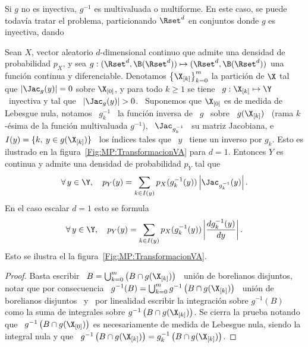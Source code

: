 Si $g$ no es inyectiva, $g^{-1}$  es multivaluada o multiforme. En este caso, se
puede todav\'ia  tratar el problema, particionando $\Rset^d$  en conjuntos donde
$g$ es inyectiva, dando
%
\begin{teorema}\label{Teo:MP:TransformacionNoInyectivaDensidad}
%
  Sean $X$, vector aleatorio $d$-dimensional continuo que admite una densidad de
  probabilidad  $p_X$,  y sea  $g:(\Rset^d  ,  \B(\Rset^d))  \mapsto (\Rset^d  ,
  \B(\Rset^d))$  una  funci\'on continua  y  diferenciable.  Denotamos  $\left\{
    \X_{[k]} \right\}_{k=0}^m$ la partici\'on  de $\X$ tal que $\left| \Jac_g(y)
  \right| = 0$ sobre  $\X_{[0]}$, y para todo $k \ge 1$  se tiene \ $g: \X_{[k]}
  \mapsto  \Y$ \  inyectiva  y  tal que  \  $\left| \Jac_g(y)  \right|  > 0$.  \
  Suponemos que $\X_{[0]}$ es de medida de Lebesgue nula, notamos \ $g_k^{-1}$ \
  la funci\'on inversa  de \ $g$ \ sobre \ $g(\X_{[k]})$  \ (rama $k$-\'esima de
  la  funci\'on   multivaluada  $g^{-1}$),  \  $\Jac_{g_k^{-1}}$   \  su  matriz
  Jacobiana, e \  $I(y) = \{ k, \:  y \in g(\X_{[k]}) \}$ \  los \'indices tales
  que  \  $y$  \  tiene  un   inverso  por  $g_k$.   Esto  es  ilustrado  en  la
  figura~\ref{Fig:MP:TransformacionVA} para $d = 1$.  Entonces $Y$ es continua y
  admite una densidad de probabilidad $p_Y$ tal que
  \[
  \forall  \, y  \in \Y,  \quad p_Y(y)  = \sum_{k  \in  I(y)} p_X(g_k^{-1}(y))
  \left| \Jac_{g_k^{-1}}(y) \right|.
  \]
  En el caso escalar $d = 1$ esto se formula
  \[
  \forall \, y \in \Y, \quad  p_Y(y) = \sum_{k \in I(y)} p_X(g_k^{-1}(y)) \left|
    \frac{d g_k^{-1}(y)}{dy} \right|.
  \]
  \noindent Esto se ilustra el la figura~\ref{Fig:MP:TransformacionVA}.
\end{teorema}
%
\begin{proof}
  Basta escribir \  $B = \bigcup_{k = 0}^m \left( B  \cap g(\X_{[k]}) \right)$ \
  uni\'on de  borelianos disjuntos,  notar que por  consecuencia \  $g^{-1}(B) =
  \bigcup_{k  =0}^m  g^{-1}\left(  B  \cap  g(\X_{[k]}) \right)$  \  uni\'on  de
  borelianos  disjuntos \  y \  por linealidad  escribir la  integraci\'on sobre
  $g^{-1}(B)$ como la suma de  integrales sobre $g^{-1}\left( B \cap g(\X_{[k]})
  \right)$. Se cierra  la prueba notando que \  $g^{-1}\left( B \cap g(\X_{[0]})
  \right)$ es necesariamente de medida de Lebesgue nula, siendo la integral nula
  y  que \  $g^{-1}\left( B  \cap g(\X_{[k]})  \right) =  g_k^{-1}\left(  B \cap
    g(\X_{[k]}) \right)$.
\end{proof}

